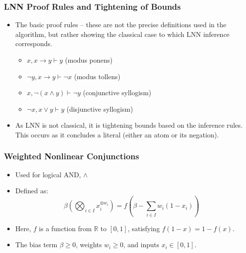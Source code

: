 \documentclass{beamer}
\begin{document}
\begin{frame}
\frametitle{LNN Proof Rules and Tightening of Bounds}
\begin{itemize}
  \item The basic proof rules – these are not the precise definitions
    used in the algorithm, but rather showing the classical case to
    which LNN inference corresponds.
  \begin{itemize}
    \item $x, x \rightarrow y \vdash y$ (modus ponens)
    \item $\neg y, x \rightarrow y \vdash \neg x$ (modus tollens)
    \item $x, \neg (x \land y) \vdash \neg y$ (conjunctive syllogism)
    \item $\neg x, x \lor y \vdash y$ (disjunctive syllogism)
  \end{itemize}
  \item As LNN is not classical, it is tightening bounds based on the
    inference rules. This occurs as it concludes a literal (either an
    atom or its negation).
\end{itemize}
\end{frame}

\begin{frame}
\frametitle{Weighted Nonlinear Conjunctions}
\begin{itemize}
    \item Used for logical AND, $\land$
    \item Defined as:
    \[ \beta (\bigotimes_{i \in I} x_i^{\otimes w_i}) = f\left(\beta -
        \sum_{i \in I} w_i (1 - x_i)\right) \]
    \item Here, \( f \) is a function from \( \mathbb{R} \) to \( [0,
      1] \), satisfying \( f(1 - x) = 1 - f(x) \).
    \item The bias term \( \beta \geq 0 \), weights \( w_i \geq 0 \),
      and inputs \( x_i \in [0, 1] \).
\end{itemize}
\end{frame}
\end{document}
